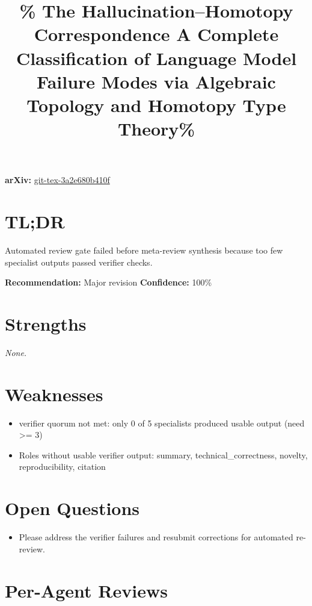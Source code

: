 \documentclass[11pt]{article}
\title{\% The Hallucination--Homotopy Correspondence A Complete Classification of Language Model Failure Modes via Algebraic Topology and Homotopy Type Theory\%}
\date{}
\begin{document}
\maketitle

\noindent\textbf{arXiv:} \href{https://arxiv.org/abs/git-tex-3a2e680b410f}{git-tex-3a2e680b410f}\\

\section*{TL;DR}
Automated review gate failed before meta-review synthesis because too few specialist outputs passed verifier checks.

\textbf{Recommendation:} Major revision \quad \textbf{Confidence:} 100\%\\

\section*{Strengths}
\textit{None.}

\section*{Weaknesses}
\begin{itemize}[leftmargin=*]
  \item verifier quorum not met: only 0 of 5 specialists produced usable output (need >= 3)
  \item Roles without usable verifier output: summary, technical\_correctness, novelty, reproducibility, citation
\end{itemize}

\section*{Open Questions}
\begin{itemize}[leftmargin=*]
  \item Please address the verifier failures and resubmit corrections for automated re-review.
\end{itemize}

\section*{Per-Agent Reviews}
\end{document}
